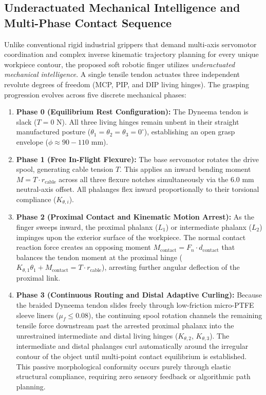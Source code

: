 \documentclass[12pt,a4paper]{report}
\begin{document}
\subsection{Underactuated Mechanical Intelligence and Multi-Phase Contact Sequence}
Unlike conventional rigid industrial grippers that demand multi-axis servomotor coordination and complex inverse kinematic trajectory planning for every unique workpiece contour, the proposed soft robotic finger utilizes \textit{underactuated mechanical intelligence}. A single tensile tendon actuates three independent revolute degrees of freedom (MCP, PIP, and DIP living hinges). The grasping progression evolves across five discrete mechanical phases:
\begin{enumerate}
    \item \textbf{Phase 0 (Equilibrium Rest Configuration):} The Dyneema tendon is slack ($T = 0\text{ N}$). All three living hinges remain unbent in their straight manufactured posture ($\theta_1 = \theta_2 = \theta_3 = 0^\circ$), establishing an open grasp envelope ($\phi \approx 90 - 110\text{ mm}$).
    \item \textbf{Phase 1 (Free In-Flight Flexure):} The base servomotor rotates the drive spool, generating cable tension $T$. This applies an inward bending moment $M = T \cdot r_{\text{cable}}$ across all three flexure notches simultaneously via the $6.0\text{ mm}$ neutral-axis offset. All phalanges flex inward proportionally to their torsional compliance ($K_{\theta, i}$).
    \item \textbf{Phase 2 (Proximal Contact and Kinematic Motion Arrest):} As the finger sweeps inward, the proximal phalanx ($L_1$) or intermediate phalanx ($L_2$) impinges upon the exterior surface of the workpiece. The normal contact reaction force creates an opposing moment $M_{\text{contact}} = F_n \cdot d_{\text{contact}}$ that balances the tendon moment at the proximal hinge ($K_{\theta, 1}\theta_1 + M_{\text{contact}} = T \cdot r_{\text{cable}}$), arresting further angular deflection of the proximal link.
    \item \textbf{Phase 3 (Continuous Routing and Distal Adaptive Curling):} Because the braided Dyneema tendon slides freely through low-friction micro-PTFE sleeve liners ($\mu_f \le 0.08$), the continuing spool rotation channels the remaining tensile force downstream past the arrested proximal phalanx into the unrestrained intermediate and distal living hinges ($K_{\theta, 2}$, $K_{\theta, 3}$). The intermediate and distal phalanges curl automatically around the irregular contour of the object until multi-point contact equilibrium is established. This passive morphological conformity occurs purely through elastic structural compliance, requiring zero sensory feedback or algorithmic path planning.

\end{enumerate}
\end{document}
